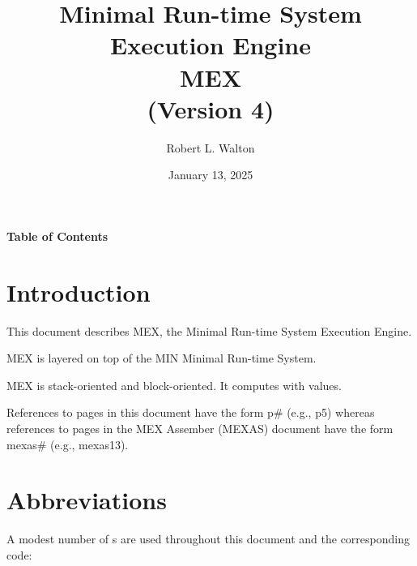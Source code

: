 \documentclass[12pt]{article}
\begin{document}
        
\title{Minimal Run-time System\\[2ex]Execution Engine\\[2ex]MEX\\[2ex]
       (Version 4)}

\author{Robert L. Walton}

\date{January 13, 2025}
 
\maketitle

\begin{center}
\large \bf Table of Contents
\end{center}

\bigskip

\tableofcontents 

\newpage

\section{Introduction}

This document describes MEX,
the Minimal Run-time System Execution Engine.

MEX is layered on top of the MIN Minimal Run-time System.

MEX is stack-oriented and block-oriented.  It computes with
 values.

References to pages in this document have the form p\# (e.g., p5)
whereas references to pages in the MEX Assember (MEXAS) document have the
form mexas\# (e.g., mexas13).

\section{Abbreviations}
\label{ABBREVIATIONS}

A modest number of s are used throughout this document
and the corresponding code:
\end{document}
